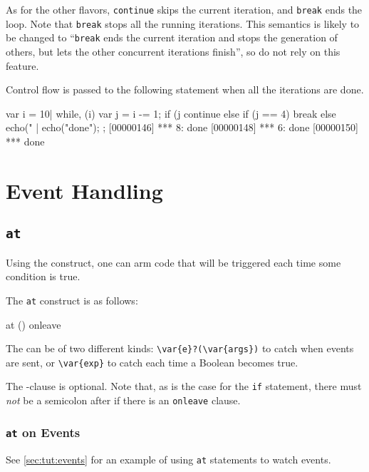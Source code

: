 As for the other flavors, \lstinline|continue| skips the current iteration,
and \lstinline|break| ends the loop.  Note that \lstinline|break| stops all
the running iterations.  This semantics is likely to be changed to
``\lstinline|break| ends the current iteration and stops the generation of
others, but lets the other concurrent iterations finish'', so do not rely on
this feature.

Control flow is passed to the following statement when all the iterations
are done.

\begin{urbiscript}
{
  var i = 10|
  while, (i)
  {
    var j = i -= 1;
    if (j %
      continue
    else if (j == 4)
      break
    else
      echo("%
  }|
  echo("done");
};
[00000146] *** 8: done
[00000148] *** 6: done
[00000150] *** done
\end{urbiscript}


\section{Event Handling}

\subsection{\lstinline'at'}
\label{sec:lang:at}
Using the  construct, one can arm code that will be
triggered each time some condition is true.

The \lstinline'at' construct is as follows:

\begin{urbiunchecked}
at ()
onleave
\end{urbiunchecked}

The  can be of two different kinds:
\lstinline|\var{e}?(\var{args})| to catch when events are sent, or
\lstinline|\var{exp}| to catch each time a Boolean  becomes true.

The -clause is optional.  Note that, as is the case for
the \lstinline|if| statement, there must \emph{not} be a semicolon after
 if there is an \lstinline|onleave| clause.

\subsubsection{\lstinline'at' on Events}
See \autoref{sec:tut:events} for an example of using \lstinline|at|
statements to watch events.

